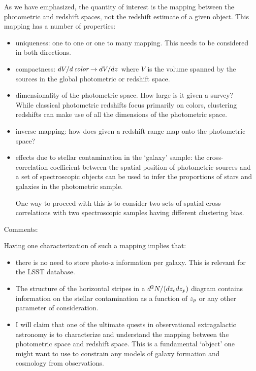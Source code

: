 \documentclass[12pt]{article}
\begin{document}
As we have emphasized, the quantity of interest is the mapping between the photometric and redshift spaces,
not the redshift estimate of a given object. This mapping has a number of properties:

\begin{itemize}
\item uniqueness: one to one or one to many mapping.
  This needs to be considered in both directions.

\item compactness: $dV/d\,\mbox{\it color} \rightarrow dV/dz$ where $V$ is the volume spanned by the sources in the
  global photometric or redshift space.

\item dimensionality of the photometric space. How large is it given a survey? While classical photometric redshifts focus primarily on colors, clustering redshifts can make use of all the dimensions of the photometric space.

\item inverse mapping: how does given a redshift range map onto the photometric space?

\item effects due to stellar contamination in the `galaxy' sample: the cross-correlation coefficient between the spatial position of photometric sources and a set of spectroscopic objects can be used to infer the proportions of stars and galaxies in the photometric sample. 

One way to proceed with this is to consider two sets of spatial cross-correlations with two spectroscopic
samples having different clustering bias.

\end{itemize}

Comments:

Having one characterization of such a mapping implies that:
\begin{itemize}
\item there is no need to store photo-z information per galaxy. This is relevant for the LSST database.
\item The structure of the horizontal stripes in a $d^2N/(dz_c dz_p)$ diagram contains information on the stellar contamination as a function of $z_p$ or any other parameter of consideration.

\item I will claim that one of the ultimate quests in observational extragalactic astronomy is to characterize and understand the mapping between the photometric space and redshift space. This is a fundamental `object' one might want to use to constrain any models of galaxy formation and cosmology from observations.
\end{itemize}
\end{document}
